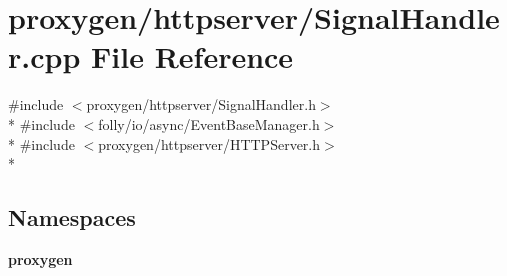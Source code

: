 \section{proxygen/httpserver/\+Signal\+Handler.cpp File Reference}
\label{SignalHandler_8cpp}
{\ttfamily \#include $<$proxygen/httpserver/\+Signal\+Handler.\+h$>$}\\*
{\ttfamily \#include $<$folly/io/async/\+Event\+Base\+Manager.\+h$>$}\\*
{\ttfamily \#include $<$proxygen/httpserver/\+H\+T\+T\+P\+Server.\+h$>$}\\*
\subsection*{Namespaces}
\begin{DoxyCompactItemize}
\item 
 {\bf proxygen}
\end{DoxyCompactItemize}
